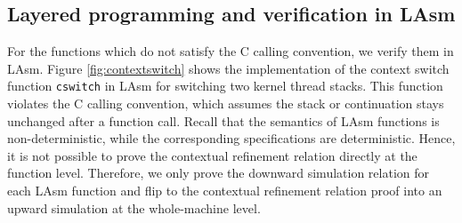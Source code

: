 \subsection{Layered programming and verification in LAsm}
For the functions which do not satisfy the C calling convention, we verify them in 
LAsm. Figure \ref{fig:contextswitch} shows the implementation of the context switch function
\verb"cswitch" in LAsm for switching two kernel thread stacks. This function violates
the C calling convention, which assumes the stack or continuation stays unchanged after
a function call.
Recall that the semantics of LAsm functions is non-deterministic, while the
corresponding  specifications are deterministic.
Hence, it is not possible to prove the contextual refinement relation 
directly at the function level. 
Therefore, we only prove the downward simulation relation for each LAsm function
and flip to the contextual refinement relation proof into an upward simulation
at the whole-machine level. 






